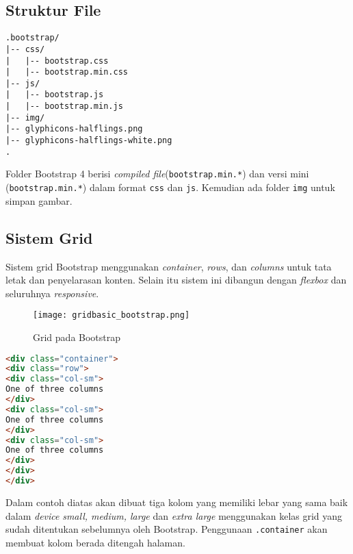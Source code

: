 \subsection{Struktur File}
\begin{lstlisting}[basicstyle=\ttfamily, frame=single,
columns=fullflexible, keepspaces=true, breaklines=true, label={lst:strukturBootstrap}, caption=Struktur file pada bootstrap 4]
.bootstrap/
|-- css/
|   |-- bootstrap.css 
|   |-- bootstrap.min.css 
|-- js/
|   |-- bootstrap.js
|   |-- bootstrap.min.js
|-- img/
|-- glyphicons-halflings.png
|-- glyphicons-halflings-white.png
.
\end{lstlisting}
Folder Bootstrap 4 berisi \textit{compiled file}(\texttt{bootstrap.min.*}) dan versi mini (\texttt{bootstrap.min.*}) dalam format \texttt{css} dan \texttt{js}. Kemudian ada folder \texttt{img} untuk simpan gambar.

\subsection{Sistem Grid}
Sistem grid Bootstrap menggunakan \textit{container}, \textit{rows}, dan \textit{columns} untuk tata letak dan penyelarasan konten. Selain itu sistem ini dibangun dengan \textit{flexbox} dan seluruhnya \textit{responsive}. \cite{bootstrap:19}
\begin{figure} [H]
	\centering  
	\texttt{[image: gridbasic\_bootstrap.png]}  
	\caption{Grid pada Bootstrap} 
	\label{fig:gridBootstrap}
\end{figure}

\begin{lstlisting}[language=HTML,  basicstyle=\ttfamily, frame=single, columns=fullflexible, keepspaces=true, breaklines=true, showstringspaces=false, label={lst:gridBootstrap}, caption=Sistem grid pada bootstrap 4] 
<div class="container">
<div class="row">
<div class="col-sm">
One of three columns
</div>
<div class="col-sm">
One of three columns
</div>
<div class="col-sm">
One of three columns
</div>
</div>
</div>
\end{lstlisting}
Dalam contoh diatas akan dibuat tiga kolom yang memiliki lebar yang sama baik dalam \textit{device} \textit{small, medium, large} dan \textit{extra large} menggunakan kelas grid yang sudah ditentukan sebelumnya oleh Bootstrap. Penggunaan \verb|.container| akan membuat kolom berada ditengah halaman.

